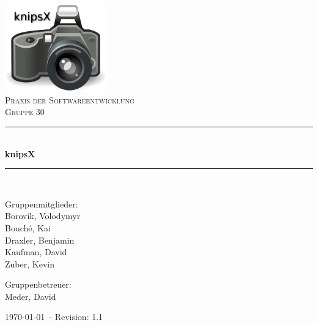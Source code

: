 
\newcommand{\HRule}{\rule{\linewidth}{0.5mm}}

\begin{titlepage}
 
\begin{center}
 
 
\includegraphics[width=0.33\textwidth]{images/cover.eps}\\[3cm]
 
\textsc{\LARGE Praxis der Softwareentwicklung}\\[1.5cm]
 
\textsc{\Large Gruppe 30 }\\[0.5cm]
 
 
\HRule \\[0.4cm]
{ \huge \bfseries knipsX}\\[0.4cm]
 
\HRule \\[1.5cm]
 
\begin{minipage}{0.4\textwidth}
\begin{flushleft} \large

Gruppenmitglieder: \\
Borovik, Volodymyr \\
Bouché, Kai \\
Draxler, Benjamin \\
Kaufman, David \\
Zuber, Kevin

\end{flushleft}
\end{minipage}
\begin{minipage}{0.4\textwidth}
\begin{flushright} \large
Gruppenbetreuer: \\
Meder, David
\end{flushright}
\end{minipage} 
\vfill

{\large \today ~- Revision: 1.1}
 
\end{center}
\end{titlepage}